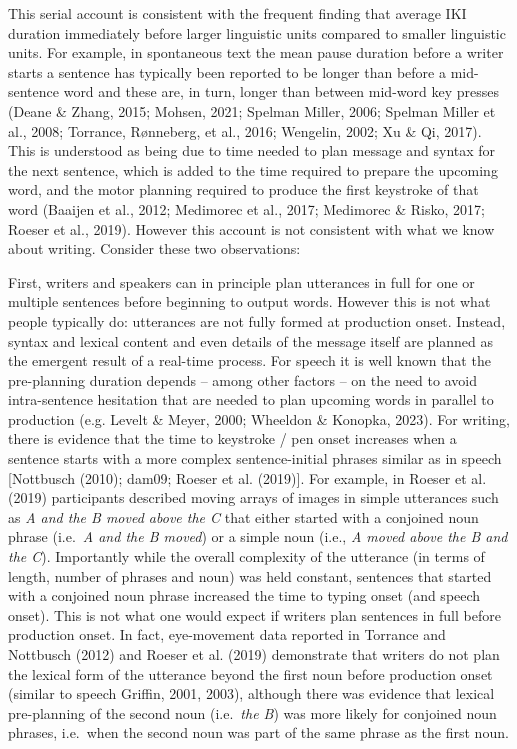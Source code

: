 \documentclass[
  man,floatsintext]{apa7}
\begin{document}
This serial account is consistent with the frequent finding that average IKI duration immediately before larger linguistic units compared to smaller linguistic units. For example, in spontaneous text the mean pause duration before a writer starts a sentence has typically been reported to be longer than before a mid-sentence word and these are, in turn, longer than between mid-word key presses (Deane \& Zhang, 2015; Mohsen, 2021; Spelman Miller, 2006; Spelman Miller et al., 2008; Torrance, Rønneberg, et al., 2016; Wengelin, 2002; Xu \& Qi, 2017). This is understood as being due to time needed to plan message and syntax for the next sentence, which is added to the time required to prepare the upcoming word, and the motor planning required to produce the first keystroke of that word (Baaijen et al., 2012; Medimorec et al., 2017; Medimorec \& Risko, 2017; Roeser et al., 2019). However this account is not consistent with what we know about writing. Consider these two observations:

First, writers and speakers can in principle plan utterances in full for one or multiple sentences before beginning to output words. However this is not what people typically do: utterances are not fully formed at production onset. Instead, syntax and lexical content and even details of the message itself are planned as the emergent result of a real-time process. For speech it is well known that the pre-planning duration depends -- among other factors -- on the need to avoid intra-sentence hesitation that are needed to plan upcoming words in parallel to production (e.g. Levelt \& Meyer, 2000; Wheeldon \& Konopka, 2023). For writing, there is evidence that the time to keystroke / pen onset increases when a sentence starts with a more complex sentence-initial phrases similar as in speech {[}Nottbusch (2010); dam09; Roeser et al. (2019){]}. For example, in Roeser et al. (2019) participants described moving arrays of images in simple utterances such as \emph{A and the B moved above the C} that either started with a conjoined noun phrase (i.e.~\emph{A and the B moved}) or a simple noun (i.e., \emph{A moved above the B and the C}). Importantly while the overall complexity of the utterance (in terms of length, number of phrases and noun) was held constant, sentences that started with a conjoined noun phrase increased the time to typing onset (and speech onset). This is not what one would expect if writers plan sentences in full before production onset. In fact, eye-movement data reported in Torrance and Nottbusch (2012) and Roeser et al. (2019) demonstrate that writers do not plan the lexical form of the utterance beyond the first noun before production onset (similar to speech Griffin, 2001, 2003), although there was evidence that lexical pre-planning of the second noun (i.e.~\emph{the B}) was more likely for conjoined noun phrases, i.e.~when the second noun was part of the same phrase as the first noun.
\end{document}
